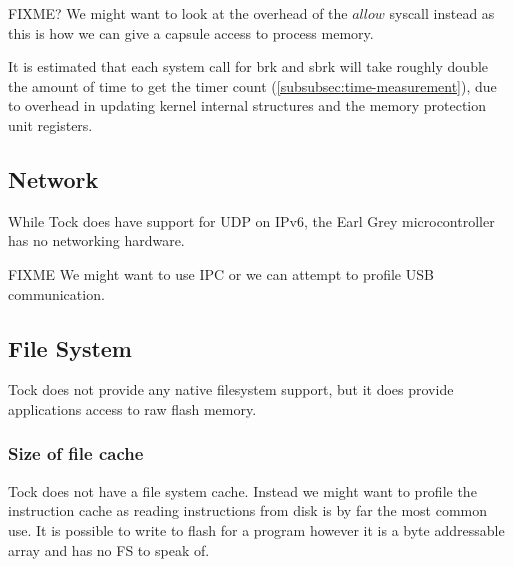 \documentclass{article}
\begin{document}
FIXME? We might want to look at the overhead of the $allow$ syscall instead as this is how we can give a capsule access to process memory.

It is estimated that each system call for brk and sbrk will take roughly double the amount of time to get the timer count (\ref{subsubsec:time-measurement}), due to overhead in updating kernel internal structures and the memory protection unit registers.

\subsection{Network}

While Tock does have support for UDP on IPv6, the Earl Grey microcontroller has no networking hardware.


FIXME We might want to use IPC or we can attempt to profile USB communication.

\subsection{File System}


Tock does not provide any native filesystem support, but it does provide applications access to raw flash memory.

\subsubsection{Size of file cache}
Tock does not have a file system cache. Instead we might want to profile the instruction cache as reading instructions from disk is by far the most common use. It is possible to write to flash for a program however it is a byte addressable array and has no FS to speak of.
\end{document}
